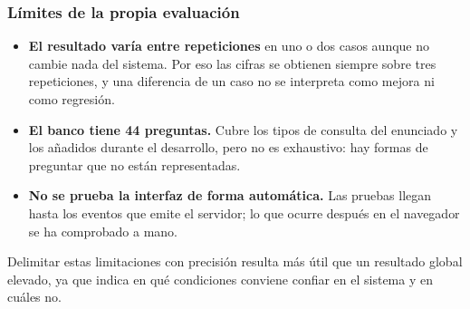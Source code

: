 \subsubsection{Límites de la propia evaluación}

\begin{itemize}
    \item \textbf{El resultado varía entre repeticiones} en uno o dos casos
    aunque no cambie nada del sistema. Por eso las cifras se obtienen siempre
    sobre tres repeticiones, y una diferencia de un caso no se interpreta como
    mejora ni como regresión.

    \item \textbf{El banco tiene 44 preguntas.} Cubre los tipos de consulta del
    enunciado y los añadidos durante el desarrollo, pero no es exhaustivo: hay
    formas de preguntar que no están representadas.

    \item \textbf{No se prueba la interfaz de forma automática.} Las pruebas
    llegan hasta los eventos que emite el servidor; lo que ocurre después en el
    navegador se ha comprobado a mano.
\end{itemize}

Delimitar estas limitaciones con precisión resulta más útil que un resultado
global elevado, ya que indica en qué condiciones conviene confiar en el sistema
y en cuáles no.
